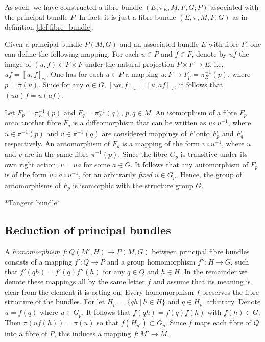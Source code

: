 \documentclass[10pt,reqno]{amsart}
\numberwithin{equation}{section}
\begin{document}
As such, we have constructed a fibre bundle $(E,\pi_E,M,F,G;P)$ 
associated with the principal bundle $P$. In fact, it is just a 
fibre bundle $(E,\pi,M,F,G)$ as in definition 
\ref{def:fibre_bundle}.

\blankline
Given a principal bundle $P(M,G)$ and an associated bundle $E$ 
with fibre $F$, one can define the following mapping. For each $u 
\in P$ and $f \in F$, denote by $uf$ the image of $(u,f) \in P 
\times F$ under the natural projection $P \times F \rightarrow 
E$, i.e.\ $uf = [u,f]_\sim$. One has for each $u \in P$ a mapping 
$u : F \rightarrow F_p = \pi^{-1}_E(p)$, where $p = \pi(u)$.  
Since for any $a \in G$, $[ua,f]_\sim = [u,af]_\sim$, it follows 
that $(ua)f = u(af)$.

Let $F_p = \pi^{-1}_E(p)$ and $F_q = \pi^{-1}_E(q)$, $p,q \in M$.  
An isomorphism of a fibre $F_p$ onto another fibre $F_q$ is a 
diffeomorphism that can be written as $v \circ u^{-1}$, where $u 
\in \pi^{-1}(p)$ and $v \in \pi^{-1}(q)$ are considered mappings 
of $F$ onto $F_p$ and $F_q$ respectively. An automorphism of 
$F_p$ is a mapping of the form $v \circ u^{-1}$, where $u$ and 
$v$ are in the same fibre $\pi^{-1}(p)$. Since the fibre $G_p$ is 
transitive under its own right action, $v = ua$ for some $a \in 
G$. It follows that any automorphism of $F_p$ is of the form $u 
\circ a \circ u^{-1}$, for an arbitrarily \emph{fixed} $u \in 
G_p$.  Hence, the group of automorphisms of $F_p$ is isomorphic 
with the structure group $G$.

\begin{example}
	*Tangent bundle*
\end{example}

\subsection{Reduction of principal bundles}

A \emph{homomorphism} $f : Q(M',H) \to P(M,G)$ between principal 
fibre bundles consists of a mapping $f' : Q \to P$ and a group 
homomorphism $f'' : H \to G$, such that $f'(qh) = f'(q)f''(h)$ 
for any $q \in Q$ and $h \in H$. In the remainder we denote these 
mappings all by the same letter $f$ and assume that its meaning 
is clear from the element it is acting on. Every homomorphism $f$ 
preserves the fibre structure of the bundles. For let $H_{p'} = 
\{qh~|~h \in H\}$ and $q \in H_{p'}$ arbitrary. Denote $u = f(q)$ 
where $u \in G_p$. It follows that $f(qh) = f(q)f(h)$ with $f(h) 
\in G$. Then $\pi(uf(h)) = \pi(u)$ so that $f(H_{p'}) \subset 
G_p$. Since $f$ maps each fibre of $Q$ into a fibre of $P$, this 
induces a mapping $f: M' \to M$.
\end{document}
